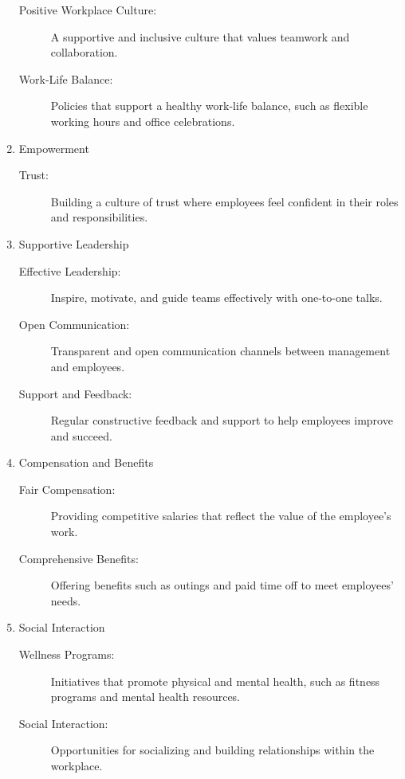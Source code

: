 \begin{enumerate}
        \begin{description}
            \item[Positive Workplace Culture:] A supportive and inclusive culture that values teamwork and collaboration.
            \item[Work-Life Balance:] Policies that support a healthy work-life balance, such as flexible working hours and office celebrations.
        \end{description}
        \item Empowerment
        \begin{description}
            \item[Trust:] Building a culture of trust where employees feel confident in their roles and responsibilities.
        \end{description}
        \item Supportive Leadership
        \begin{description}
            \item[Effective Leadership: ] Inspire, motivate, and guide teams effectively with one-to-one talks.
            \item[Open Communication: ] Transparent and open communication channels between management and employees.
            \item[Support and Feedback: ] Regular constructive feedback and support to help employees improve and succeed.
        \end{description}
        \item Compensation and Benefits
        \begin{description}
            \item[Fair Compensation:] Providing competitive salaries that reflect the value of the employee's work.
            \item[Comprehensive Benefits: ] Offering benefits such as outings and paid time off to meet employees' needs.
        \end{description}
        \item Social Interaction
        \begin{description}
            \item[Wellness Programs:] Initiatives that promote physical and mental health, such as fitness programs and mental health resources.
            \item[Social Interaction:]  Opportunities for socializing and building relationships within the workplace.
        \end{description}
    \end{enumerate}

